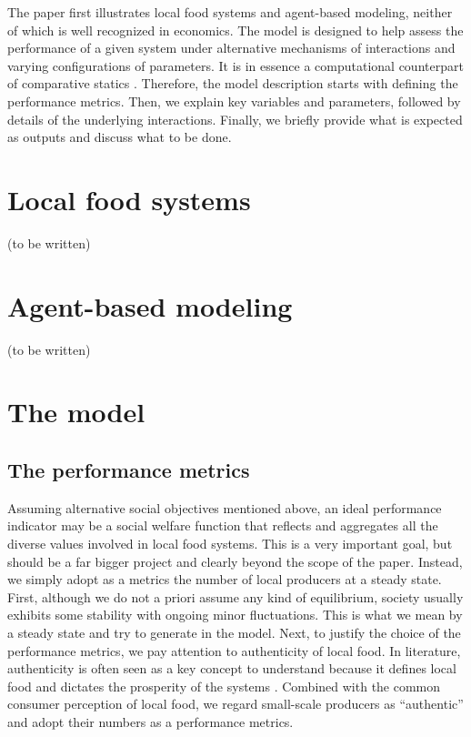 \documentclass[11pt, oneside]{article}
\begin{document}
The paper first illustrates local food systems and agent-based modeling, neither of which is well recognized in economics. The model is designed to help assess the performance of a given system under alternative mechanisms of interactions and varying configurations of parameters. It is in essence a computational counterpart of comparative statics \parencite{Judd2006}. Therefore, the model description starts with defining the performance metrics. Then, we explain key variables and parameters, followed by details of the underlying interactions. Finally, we briefly provide what is expected as outputs and discuss what to be done.

\section{Local food systems}
(to be written)


\section{Agent-based modeling}
(to be written)


\section{The model}
\subsection{The performance metrics}
Assuming alternative social objectives mentioned above, an ideal performance indicator may be a social welfare function that reflects and aggregates all the diverse values involved in local food systems. This is a very important goal, but should be a far bigger project and clearly beyond the scope of the paper. Instead, we simply adopt as a metrics the number of local producers at a steady state. First, although we do not a priori assume any kind of equilibrium, society usually exhibits some stability with ongoing minor fluctuations. This is what we mean by a steady state and try to generate in the model. Next, to justify the choice of the performance metrics, we pay attention to authenticity of local food. In literature, authenticity is often seen as a key concept to understand because it defines local food and dictates the prosperity of the systems \parencite{Sims2009, Wittman2012}. Combined with the common consumer perception of local food, we regard small-scale producers as ``authentic'' and adopt their numbers as a performance metrics.
\end{document}

